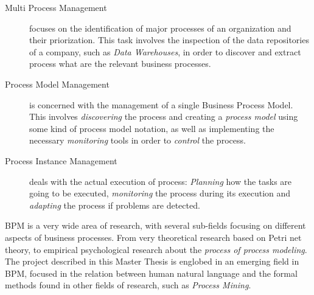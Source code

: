 \begin{description}
  \item[Multi Process Management]{ focuses on the identification of major
      processes of an organization and their priorization. This task
      involves the inspection of the data repositories of a company, such as
      \emph{Data Warehouses}, in order to discover and extract process
      what are the relevant business processes.}
  \item[Process Model Management]{ is concerned with the management of a single
      Business Process Model. This involves \emph{discovering} the process and
      creating a \emph{process model} using some kind of process model notation,
      as well as implementing the necessary \emph{monitoring} tools in order to
      \emph{control} the process.}
  \item[Process Instance Management]{ deals with the actual execution of
      process: \emph{Planning} how the tasks are going to be executed,
      \emph{monitoring} the process during its execution and \emph{adapting} the
      process if problems are detected.}
\end{description}


BPM is a very wide area of research, with several sub-fields focusing on
different aspects of business processes. From very theoretical research based on
Petri net theory\cite{citation needed}, to empirical psychological research
about the \emph{process of process modeling}\cite{citation needed}. The project
described in this Master Thesis is englobed in an emerging
field\cite{vanderaa2018challenges} in BPM, focused in the relation between human
natural language and the formal methods found in other fields of research, such
as \emph{Process Mining}\cite{van2016process}.



